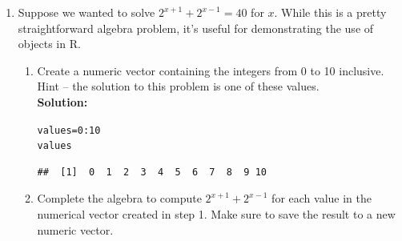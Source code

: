 \documentclass{article}\usepackage[]{graphicx}\usepackage[]{xcolor}
\makeatletter
\newcommand{\hlnum}[1]{\textcolor[rgb]{0.686,0.059,0.569}{#1}}%
\newcommand{\hlopt}[1]{\textcolor[rgb]{0,0,0}{#1}}%
\newcommand{\hldef}[1]{\textcolor[rgb]{0.345,0.345,0.345}{#1}}%
\newcommand{\hlkwb}[1]{\textcolor[rgb]{0.69,0.353,0.396}{#1}}%
\newenvironment{kframe}{%
 \def\at@end@of@kframe{}%
 \ifinner\ifhmode%
  \def\at@end@of@kframe{\end{minipage}}%
  \begin{minipage}{\columnwidth}%
 \fi\fi%
 \def\FrameCommand##1{\hskip\@totalleftmargin \hskip-\fboxsep
 \colorbox{shadecolor}{##1}\hskip-\fboxsep
     \hskip-\linewidth \hskip-\@totalleftmargin \hskip\columnwidth}%
 \MakeFramed {\advance\hsize-\width
   \@totalleftmargin\z@ \linewidth\hsize
   \@setminipage}}%
 {\par\unskip\endMakeFramed%
 \at@end@of@kframe}
\newenvironment{knitrout}{}{} %
\makeatother
\begin{document}
\begin{enumerate}
\begin{enumerate}
  \item Use \texttt{citation()} to get the BiBTeX citation for the \texttt{aRtsy}
  package and use \verb|\citep{}| to add a parenthetical citation to the end of
  the sentence below.
\textbf{Solution:} We created the generative art in Question 1 using the \texttt{aRtsy}
package for \texttt{R}. \verb|\cite{aRtsy}|

\end{enumerate}

\newpage

\item Suppose we wanted to solve $2^{x+1} +2^{x-1} = 40$ for $x$. While this is a pretty straightforward algebra problem, it's useful for demonstrating the use of objects in R. 
  \begin{enumerate}
  \item Create a numeric vector containing the integers from 0 to 10 inclusive. Hint -- the solution to this problem is one of these values.\\
\textbf{Solution:}
\begin{knitrout}\scriptsize
{}\color{fgcolor}\begin{kframe}
\begin{alltt}
\hldef{values} \hlkwb{=} \hlnum{0}\hlopt{:}\hlnum{10}
\hldef{values}
\end{alltt}
\begin{verbatim}
##  [1]  0  1  2  3  4  5  6  7  8  9 10
\end{verbatim}
\end{kframe}
\end{knitrout}
  \item Complete the algebra to compute $2^{x+1} +2^{x-1}$ for each value in the numerical vector created in step 1. Make sure to save the result to a new numeric vector.\\

\end{enumerate}
\end{enumerate}
\end{document}

